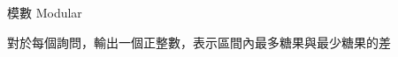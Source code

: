 \begin{problem}{模數 Modular}

\OutputFile

對於每個詢問，輸出一個正整數，表示區間內最多糖果與最少糖果的差

\Examples

\begin{example}
\end{example}

\end{problem}
